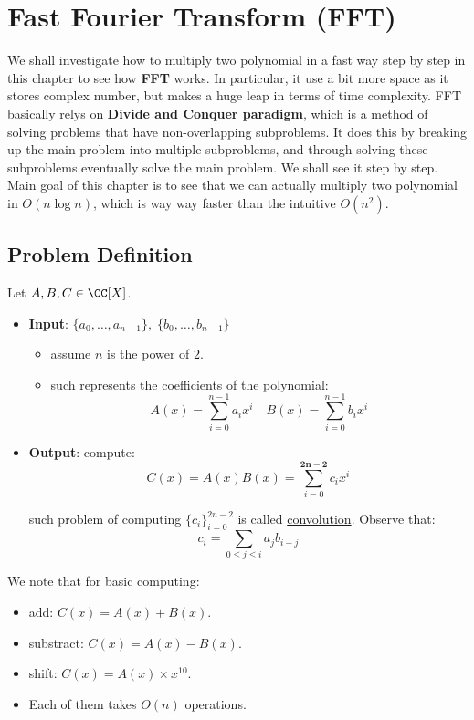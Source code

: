 \chapter{Fast Fourier Transform (FFT)}

We shall investigate how to multiply two polynomial in a fast way step by step in this chapter to see how \textbf{FFT} works. In particular, it use a bit more space as it stores complex number, but makes a huge leap in terms of time complexity. FFT basically relys on \textbf{Divide and Conquer paradigm}, which is a method of solving problems that have non-overlapping subproblems. It does this by breaking up the main problem into multiple subproblems, and through solving these subproblems eventually solve the main problem. We shall see it step by step. Main goal of this chapter is to see that we can actually multiply two polynomial in \( O(n\log n) \), which is way way faster than the intuitive \( O(n^2) \).

\section{Problem Definition}

\begin{question}
  Let \( A, B, C \in \CC[X] \).
  \begin{itemize}
    \item \textbf{Input}: \( \{a_0, \ldots, a_{n-1}\}, \; \{b_0, \ldots, b_{n-1}\} \)
      \begin{itemize}
        \item assume \( n \) is the power of \( 2 \).
        \item such represents the coefficients of the polynomial:
          \[
            A(x)= \sum_{i=0}^{n-1}a_i x^i \quad B(x) = \sum_{i=0}^{n-1}b_i x^i 
          \] 
      \end{itemize}
    \item \textbf{Output}: compute:
      \[
        C(x) = A(x)B(x) = \sum_{i=0}^{\mathbf{2n-2}}c_i x^i 
      \] 

      such problem of computing \( \{c_i\}_{i=0}^{2n-2} \) is called \underline{convolution}. Observe that:
      \[
        c_i = \sum_{0\leq j \leq i} a_j b_{i-j}
      \] 
  \end{itemize}
\end{question}

We note that for basic computing:
\begin{itemize}
  \item add: $C(x) = A(x) + B(x)$. 
  \item substract: \( C(x) = A(x) - B(x) \).
  \item shift: \( C(x) = A(x) \times x^{10} \).
  \item Each of them takes \( O(n) \) operations.
\end{itemize}

